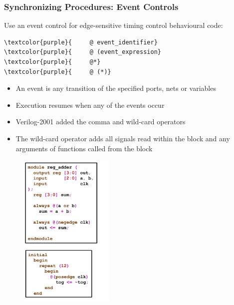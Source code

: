 \documentclass[t, notes, xcolor=table]{beamer}
\begin{document}
\begin{frame}[fragile]
\frametitle{Synchronizing Procedures: Event Controls}
\scriptsize{
\begin{multicols}{2}
Use an event control for edge-sensitive timing control behavioural code:
\begin{Verbatim}[commandchars=\\\{\}, tabsize=2]
\textcolor{purple}{		@ event_identifier}
\textcolor{purple}{		@ (event_expression}
\textcolor{purple}{		@*}
\textcolor{purple}{		@ (*)}
\end{Verbatim}
\begin{itemize}
\item An event is any transition of the specified ports, nets or variables
\item Execution resumes when any of the events occur
\item Verilog-2001 added the comma and wild-card operators
\item The wild-card operator adds all signals read within the block and any arguments of functions called from the block
\end{itemize}
\vfill
\columnbreak
\begin{figure}
    \includegraphics[width=0.4\textwidth]{img/09_sync_proc_event.png}
\end{figure}
\end{multicols}

}
\end{frame}
\end{document}
